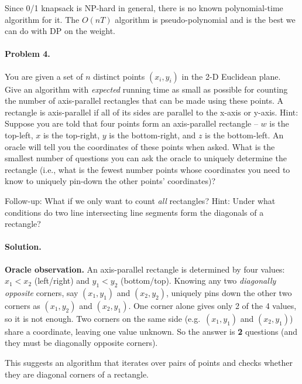 \documentclass[10pt]{article}
\begin{document}
Since 0/1 knapsack is NP-hard in general, there is no known polynomial-time algorithm for it.  The $O(nT)$ algorithm is pseudo-polynomial and is the best we can do with DP on the weight.



\paragraph{Problem 4.}  You are given a set of $n$ distinct points $(x_i,y_i)$ in the 2-D Euclidean plane.  Give an algorithm with \emph{expected} running time as small as possible for counting the number of axis-parallel rectangles that can be made using these points.  A rectangle is axis-parallel if all of its sides are parallel to the x-axis or y-axis.  Hint:  Suppose you are told that four points form an axis-parallel rectangle -- $w$ is the top-left, $x$ is the top-right, $y$ is the bottom-right, and $z$ is the bottom-left.  An oracle will tell you the coordinates of these points when asked.  What is the smallest number of questions you can ask the oracle to uniquely determine the rectangle (i.e., what is the fewest number points whose coordinates you need to know to uniquely pin-down the other points' coordinates)?

Follow-up:  What if we only want to count \emph{all} rectangles?  Hint:  Under what conditions do two line intersecting line segments form the diagonals of a rectangle?

\paragraph{Solution.}

\textbf{Oracle observation.}  An axis-parallel rectangle is determined by four values: $x_1 < x_2$ (left/right) and $y_1 < y_2$ (bottom/top).  Knowing any two \emph{diagonally opposite} corners, say $(x_1, y_1)$ and $(x_2, y_2)$, uniquely pins down the other two corners as $(x_1, y_2)$ and $(x_2, y_1)$.  One corner alone gives only 2 of the 4 values, so it is not enough.  Two corners on the same side (e.g.\ $(x_1, y_1)$ and $(x_2, y_1)$) share a coordinate, leaving one value unknown.  So the answer is \textbf{2} questions (and they must be diagonally opposite corners).

This suggests an algorithm that iterates over pairs of points and checks whether they are diagonal corners of a rectangle.
\end{document}
